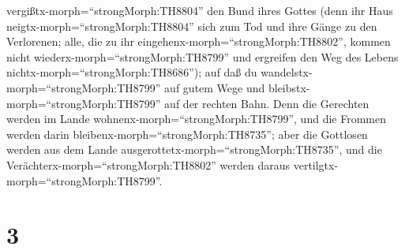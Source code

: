 vergißtx-morph=``strongMorph:TH8804'' den Bund ihres Gottes
 (denn ihr Haus neigtx-morph=``strongMorph:TH8804'' sich
zum Tod und ihre Gänge zu den Verlorenen;  alle, die zu ihr
eingehenx-morph=``strongMorph:TH8802'', kommen nicht
wiederx-morph=``strongMorph:TH8799'' und ergreifen den Weg des Lebens
nichtx-morph=``strongMorph:TH8686'');  auf daß du
wandelstx-morph=``strongMorph:TH8799'' auf gutem Wege und
bleibstx-morph=``strongMorph:TH8799'' auf der rechten Bahn.
 Denn die Gerechten werden im Lande
wohnenx-morph=``strongMorph:TH8799'', und die Frommen werden darin
bleibenx-morph=``strongMorph:TH8735'';  aber die Gottlosen
werden aus dem Lande ausgerottetx-morph=``strongMorph:TH8735'', und die
Verächterx-morph=``strongMorph:TH8802'' werden daraus
vertilgtx-morph=``strongMorph:TH8799''.

\hypertarget{section-2}{%
\section{3}\label{section-2}}

